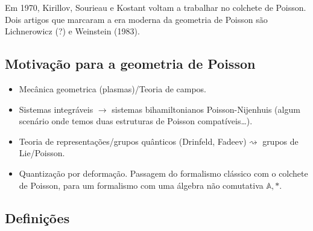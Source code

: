 Em 1970, Kirillov, Sourieau e Kostant voltam a trabalhar no colchete de Poisson. Dois artigos que marcaram a era moderna da geometria de Poisson são Lichnerowicz (?) e Weinstein (1983).

\subsection{Motivação para a geometria de Poisson}

\begin{itemize}
\item Mecânica geometrica (plasmas)/Teoria de campos.
\item Sistemas integráveis \(\to\) sistemas bihamiltonianos Poisson-Nijenhuis (algum scenário onde temos duas estruturas de Poisson compatíveis…).
\item Teoria de representações/grupos quânticos (Drinfeld, Fadeev)\(\rightsquigarrow \) grupos de Lie/Poisson.
\item Quantização por deformação. Passagem do formalismo clássico com o colchete de Poisson, para um formalismo com uma álgebra não comutativa \(\mathbb{A},*\).
\end{itemize}

\subsection{Definições}

